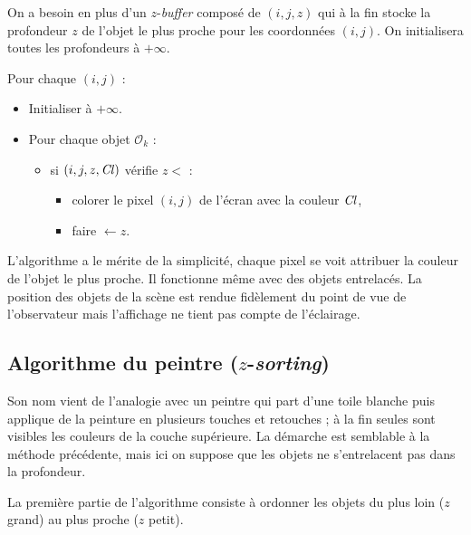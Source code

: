 \documentclass[11pt,class=report,crop=false]{standalone}
\begin{document}
On a besoin en plus d'un $z$-\emph{buffer} composé de $(i,j,z)$ qui à la fin stocke la profondeur $z$ de l'objet le plus proche pour les coordonnées $(i,j)$.
On initialisera toutes les profondeurs à $+\infty$.

\begin{algorithme}
Pour chaque $(i,j)$ :
\begin{itemize}
	\item Initialiser  à $+\infty$.
	
	\item Pour chaque objet $\mathcal{O}_k$ :
	\begin{itemize}
		\item si $(i,j,z,\operatorname{\it Cl})$ vérifie $z < $  :
		\begin{itemize}
			\item colorer le pixel $(i,j)$ de l'écran avec la couleur $\operatorname{\it Cl}$,
			\item faire  $\leftarrow z$.
		\end{itemize}
	\end{itemize}
\end{itemize}
\end{algorithme}



L'algorithme a le mérite de la simplicité, chaque pixel se voit attribuer la couleur de l'objet le plus proche. Il fonctionne même avec des objets entrelacés.
La position des objets de la scène est rendue fidèlement du point de vue de l'observateur mais l'affichage ne tient pas compte de l'éclairage.



\subsection{Algorithme du peintre ($z$-\emph{sorting})}


Son nom vient de l'analogie avec un peintre qui part d'une toile blanche puis applique de la peinture en plusieurs touches et retouches ; à la fin seules sont visibles les couleurs de la couche supérieure.
La démarche est semblable à la méthode précédente, mais ici on suppose que les objets ne s'entrelacent pas dans la profondeur.


La première partie de l'algorithme consiste à ordonner les objets du plus loin ($z$ grand) au plus proche ($z$ petit).
\end{document}
